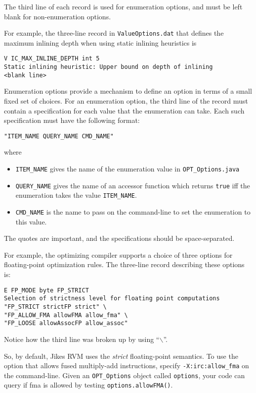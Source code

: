 The third line of each record is used for enumeration options, and must
be left blank for non-enumeration options.

For example, the three-line record in {\tt ValueOptions.dat}
that defines the maximum inlining depth when using static inlining
heuristics is
\begin{verbatim}
V IC_MAX_INLINE_DEPTH int 5
Static inlining heuristic: Upper bound on depth of inlining
<blank line>
\end{verbatim}

Enumeration options provide a mechanism to define an option in terms of 
a small fixed set of choices.  For an enumeration option, the third line
of the record must contain a specification for each value that the
enumeration can take.  Each such specification must have the following
format:
\begin{verbatim}
"ITEM_NAME QUERY_NAME CMD_NAME"
\end{verbatim}
where
\begin{itemize}
\item {\tt ITEM\_NAME} gives the name of the enumeration value in {\tt OPT\_Options.java}
\item {\tt QUERY\_NAME} gives the name of an accessor function which returns {\tt true} iff the enumeration takes the value {\tt ITEM\_NAME}.
\item {\tt CMD\_NAME} is the name to pass on the command-line to set the enumeration to this value.
\end{itemize}
The quotes are important, and the specifications should be
space-separated.

For example, the optimizing compiler supports a choice of three
options for floating-point optimization rules.  The three-line record
describing these options is:
\begin{verbatim}
E FP_MODE byte FP_STRICT
Selection of strictness level for floating point computations
"FP_STRICT strictFP strict" \
"FP_ALLOW_FMA allowFMA allow_fma" \
"FP_LOOSE allowAssocFP allow_assoc"
\end{verbatim}
Notice how the third line was broken up by using ``$\backslash$''.

So, by default, Jikes RVM uses the {\em strict} floating-point
semantics.  To use the option that allows fused multiply-add
instructions, specify {\tt -X:irc:allow\_fma} on the command-line.
Given an {\tt OPT\_Options} object called {\tt options}, your code can
query if fma is allowed by testing {\tt options.allowFMA()}.

\JikesTMFooter
